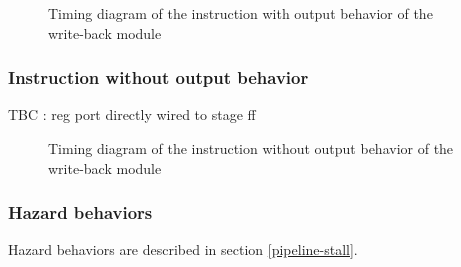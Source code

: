\begin{figure}[H]
    \centering
    
    \caption{Timing diagram of the instruction with output behavior of the write-back module}
    \label{fig:wbm-behavior-instruction-with-output}
\end{figure}

\subsubsection{Instruction without output behavior}

\begin{content}
  TBC : reg port directly wired to stage ff
\end{content}

\begin{figure}[H]
    \centering
    
    \caption{Timing diagram of the instruction without output behavior of the write-back module}
    \label{fig:wbm-behavior-instruction-without-output}
\end{figure}

\subsubsection{Hazard behaviors}

\begin{content}
  Hazard behaviors are described in section \ref{pipeline-stall}.
\end{content}

\newpage